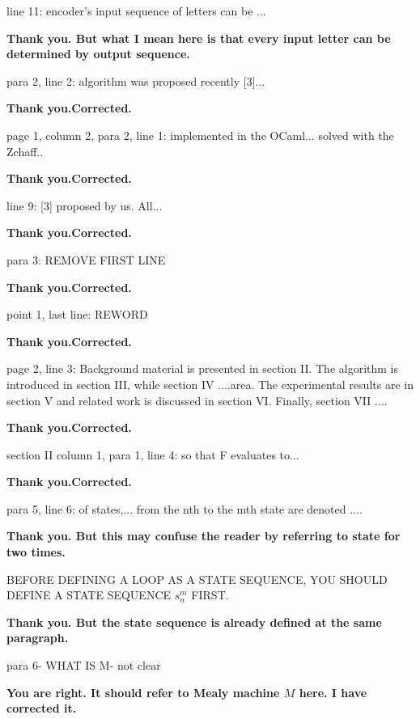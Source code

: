\documentclass[journal]{IEEEtran}
\begin{document}
{             line 11: encoder's input sequence of letters can be ...

\smallskip
\textbf{Thank you.
But what I mean here is that every input letter can be determined by output sequence.}
\smallskip

para 2, line 2: algorithm was proposed recently [3]...

\smallskip
\textbf{Thank you.Corrected.}
\smallskip

page 1, column 2, para 2, line 1: implemented in the OCaml... solved with the Zchaff..

\smallskip
\textbf{Thank you.Corrected.}
\smallskip

                                                line 9:  [3] proposed by us. All...

\smallskip
\textbf{Thank you.Corrected.}
\smallskip

                                 para 3: REMOVE FIRST LINE

\smallskip
\textbf{Thank you.Corrected.}
\smallskip

                                              point 1, last line: REWORD

\smallskip
\textbf{Thank you.Corrected.}
\smallskip

page 2, line 3: Background material is presented in section II. The algorithm is introduced in section III, while section IV  ....area. The experimental results are in section V and related work is discussed in section VI. Finally, section VII ....

\smallskip
\textbf{Thank you.Corrected.}
\smallskip

section II
column 1, para 1, line 4: so that F evaluates to...

\smallskip
\textbf{Thank you.Corrected.}
\smallskip

para 5, line 6: of states,... from the nth to the mth state are denoted ....

\smallskip
\textbf{Thank you.
But this may confuse the reader by referring to state for two times.}
\smallskip

BEFORE DEFINING A LOOP AS A STATE SEQUENCE, YOU SHOULD DEFINE A STATE SEQUENCE $s^m_n$ FIRST.

\smallskip
\textbf{Thank you.
But the state sequence is already defined at the same paragraph.}
\smallskip

para 6- WHAT IS M- not clear

\smallskip
\textbf{You are right.
It should refer to Mealy machine $M$ here.
I have corrected it.}
\smallskip

}
\end{document}
